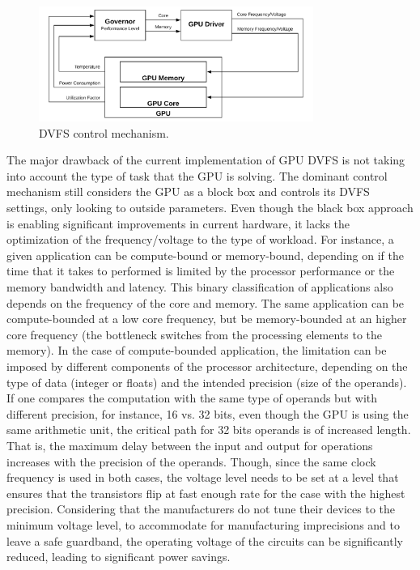 \begin{figure}[!htb]
  \centering
  \includegraphics[width=0.8\textwidth]{Figures/StateArt/DVFS.png}
  \caption[Controller]{DVFS control mechanism.}
  \label{fig:DVFSmechanism}
\end{figure}

The major drawback of the current implementation of GPU DVFS is not taking into account the type of task that the GPU is solving. The dominant control mechanism still considers the GPU as a block box and controls its DVFS settings, only looking to outside parameters. Even though the black box approach is enabling significant improvements in current hardware, it lacks the optimization of the frequency/voltage to the type of workload. For instance, a given application can be compute-bound or memory-bound, depending on if the time that it takes to performed is limited by the processor performance or the memory bandwidth and latency. This binary classification of applications also depends on the frequency of the core and memory. The same application can be compute-bounded at a low core frequency, but be memory-bounded at an higher core frequency \cite{guerreiro_dvfs-aware_2019} (the bottleneck switches from the processing elements to the memory). In the case of compute-bounded application, the limitation can be imposed by different components of the processor architecture, depending on the type of data (integer or floats) and the intended precision (size of the operands). If one compares the computation with the same type of operands but with different precision, for instance, 16 vs. 32 bits, even though the GPU is using the same arithmetic unit, the critical path for 32 bits operands is of increased length. That is, the maximum delay between the input and output for operations increases with the precision of the operands. Though, since the same clock frequency is used in both cases, the voltage level needs to be set at a level that ensures that the transistors flip at fast enough rate for the case with the highest precision. Considering that the manufacturers do not tune their devices to the minimum voltage level, to accommodate for manufacturing imprecisions and to leave a safe guardband, the operating voltage of the circuits can be significantly reduced, leading to significant power savings. 

